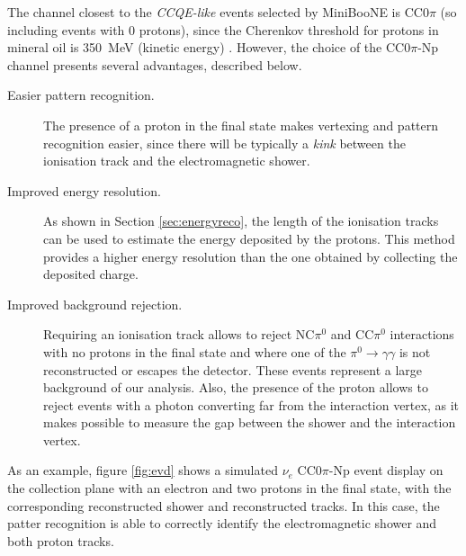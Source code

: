 The channel closest to the \emph{CCQE-like} events selected by MiniBooNE is CC0$\pi$ (so including events with 0 protons), since the Cherenkov threshold for protons in mineral oil is 350~MeV (kinetic energy) \cite{Perevalov:2009mn}.
However, the choice of the CC0$\pi$-Np channel presents several advantages, described below.
\begin{description}
    \item[Easier pattern recognition.] The presence of a proton in the final state makes vertexing and pattern recognition easier, since there will be typically a \emph{kink} between the ionisation track and the electromagnetic shower.
    \item[Improved energy resolution.] As shown in Section \ref{sec:energyreco}, the length of the ionisation tracks can be used to estimate the energy deposited by the protons. This method provides a higher energy resolution than the one obtained by collecting the deposited charge.
    \item[Improved background rejection.] Requiring an ionisation track allows to reject NC$\pi^0$ and CC$\pi^0$ interactions with no protons in the final state and where one of the $\pi^0\rightarrow\gamma\gamma$ is not reconstructed or escapes the detector. These events represent a large background of our analysis. Also, the presence of the proton allows to reject events with a photon converting far from the interaction vertex, as it makes possible to measure the gap between the shower and the interaction vertex.
\end{description}


As an example, figure \ref{fig:evd} shows a simulated $\nu_{e}$ CC0$\pi$-Np event display on the collection plane with an electron and two protons in the final state, with the corresponding reconstructed shower and reconstructed tracks. In this case, the patter recognition is able to correctly identify the electromagnetic shower and both proton tracks.

